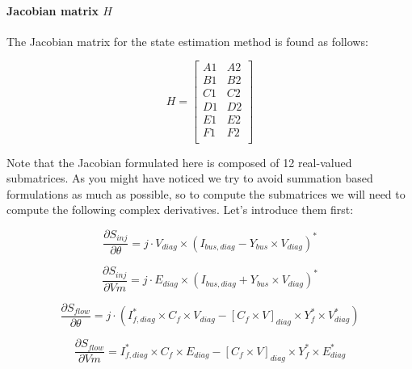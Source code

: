 \documentclass[nols,a4paper,twoside,notoc,fleqn]{tufte-book}
\begin{document}
\paragraph{Jacobian matrix $H$}

The Jacobian matrix for the state estimation method is found as follows:

\begin{equation}
H=
\left[
\begin{array}{cc}
A1 &
A2 \\
B1 &
B2 \\
C1 &
C2 \\
D1 &
D2 \\
E1 &
E2 \\
F1 &
F2 \\
\end{array}
\right]
\label{SE_jacobian}
\end{equation}

Note that the Jacobian formulated here is composed of 12 real-valued submatrices. As you might have noticed we try to avoid summation based formulations as much as possible, so to compute the submatrices we will need to compute the following complex derivatives. Let's introduce them first:


\begin{equation}
\frac{\partial S_{inj}}{\partial \theta} = j \cdot V_{diag} \times (I_{bus,diag}-Y_{bus} \times V_{diag}  )^* 
\end{equation}

\begin{equation}\frac{\partial S_{inj}}{\partial Vm}=j \cdot E_{diag} \times (I_{bus,diag} + Y_{bus} \times V_{diag}  )^* \end{equation}

	


\begin{equation}\frac{\partial S_{flow}}{\partial \theta} = j \cdot (I_{f,diag}^* \times C_f \times V_{diag} - [C_f \times V]_{diag} \times Y_f^* \times V_{diag}^* ) 
\end{equation}

\begin{equation}\frac{\partial S_{flow}}{\partial Vm}=I_{f,diag}^* \times C_f \times E_{diag}- [C_f \times V]_{diag} \times Y_f^* \times E_{diag}^* 
\end{equation}
\end{document}
